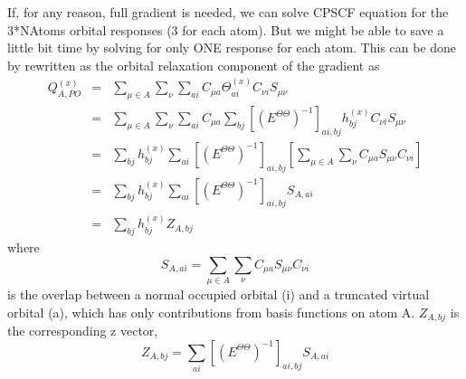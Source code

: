 \documentclass[aip,jcp,preprint,superscriptaddress,amsmath,amssymb]{revtex4-1}
\begin{document}
If, for any reason, full gradient is needed, we can solve CPSCF equation for the 3*NAtoms orbital responses (3 for each atom).   
But we might be able to save a little bit time by solving for only ONE response for each atom.   
This can be done by rewritten as the orbital relaxation component of the gradient as
\begin{eqnarray}
Q_{A,PO} ^{(x)}  &  = &  \sum_{\mu \in A} \sum_{\nu} \sum_{ai} C_{\mu a}  \Theta^{(x)}_{ai} C_{\nu i}  S_{\mu \nu}  \nonumber \\  
& = &   \sum_{\mu \in A} \sum_{\nu} \sum_{ai} C_{\mu a}  \sum_{bj} \left[ \left( E^{\Theta \Theta}  \right)^{-1} \right]_{ai, bj} h^{(x)}_{bj}  C_{\nu i}  S_{\mu \nu}  \nonumber \\
& = &  \sum_{bj} h^{(x)}_{bj}  \sum_{ai} \left[ \left( E^{\Theta \Theta}  \right)^{-1} \right]_{ai, bj} \left[  \sum_{\mu \in A} \sum_{\nu} C_{\mu a}  S_{\mu \nu}   C_{\nu i} \right]  \nonumber \\
& = &  \sum_{bj}  h^{(x)}_{bj}  \sum_{ai} \left[ \left( E^{\Theta \Theta}  \right)^{-1} \right]_{ai, bj}  S_{A, ai}  \nonumber  \\
& = & \sum_{bj}  h^{(x)}_{bj} Z_{A, bj} 
\end{eqnarray}
where 
\begin{equation}
S_{A, ai}  = \sum_{\mu \in A} \sum_{\nu} C_{\mu a}  S_{\mu \nu}   C_{\nu i}
\end{equation}
is the overlap between a normal occupied orbital (i) and a truncated virtual orbital (a),  which has only contributions from basis functions on atom A.  
$Z_{A, bj}$ is the corresponding z vector, 
\begin{equation}
Z_{A, bj}  = \sum_{ai} \left[ \left( E^{\Theta \Theta}  \right)^{-1} \right]_{ai, bj}  S_{A, ai} 
\end{equation}

%
\end{document}
